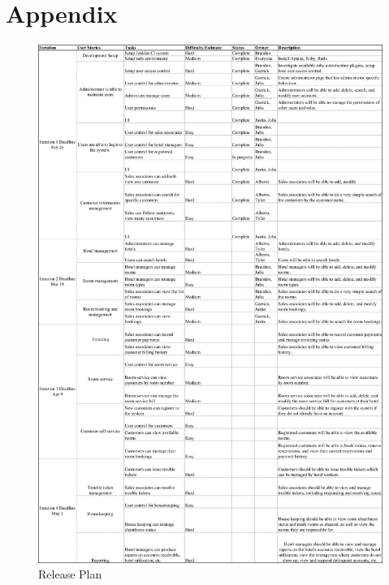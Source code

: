 \section{Appendix}
\begin{figure}[ht]
	\includegraphics[scale=0.9]{images/release_plan}
	\caption{Release Plan}
\end{figure}

